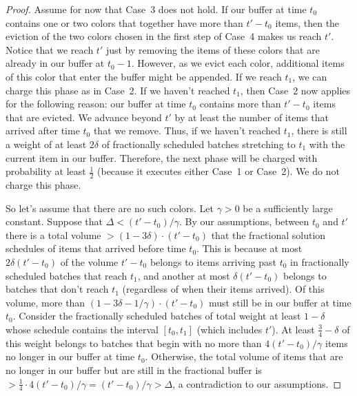 \documentclass[12pt]{article}
\begin{document}
\begin{proof}
Assume for now that Case~3 does not hold. If our buffer at 
time $t_0$ contains one or two colors that together have more
than $t' - t_0$ items, then the eviction of the two colors chosen 
in the first step of Case~4 makes us reach $t'$. Notice that we
reach $t'$ just by removing the items of these colors that are
already in our buffer at $t_0 - 1$. However, as we evict each
color, additional items of this color that enter the buffer might 
be appended. If we reach $t_1$,
we can charge this phase as in Case~2. If we haven't reached 
$t_1$, then Case~2 now applies for the following reason: our 
buffer at time $t_0$ contains more than $t'-t_0$ items that are 
evicted. We advance beyond $t'$ by at least the number of items
that arrived after time $t_0$ that we remove. Thus, if we haven't 
reached $t_1$, there is still a weight of at least $2\delta$ of 
fractionally scheduled batches stretching to $t_1$ with the current
item in our buffer. Therefore, the next phase will be charged with
probability at least $\frac 1 2$ (because it executes either Case~1
or Case~2). We do not charge this phase.

So let's assume that there are no such colors. Let $\gamma > 0$
be a sufficiently large constant. Suppose that
$\Delta < (t' - t_0) / \gamma$. By our assumptions, between
$t_0$ and $t'$ there is a total volume 
$> (1 - 3\delta)\cdot (t' - t_0)$ that the fractional solution
schedules of items that arrived before time $t_0$. This is
because at most $2\delta (t' - t_0)$ of the volume $t'-t_0$
belongs to items arriving past $t_0$ in fractionally scheduled
batches that reach $t_1$, and another at most $\delta (t' - t_0)$
belongs to batches that don't reach $t_1$
(regardless of when their items arrived). Of this volume, more 
than $(1 - 3\delta - 1/\gamma)\cdot (t'-t_0)$ must still be in 
our buffer at time $t_0$. Consider the fractionally scheduled
batches of total weight 
at least $1 - \delta$ whose schedule contains the interval
$[t_0,t_1]$ (which includes $t'$). At least
$\frac 3 4 - \delta$ of this weight belongs to batches that 
begin with no more than $4(t'-t_0)/\gamma$ items no longer in 
our buffer at time $t_0$. Otherwise, the total volume of items
that are no longer in our buffer but are still in the fractional
buffer is 
$> \frac 1 4\cdot 4(t'-t_0)/\gamma = (t'-t_0)/\gamma >\Delta$,
a contradiction to our assumptions.


\end{proof}
\end{document}
